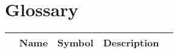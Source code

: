\section{Glossary}\label{sec:glossary}

\begin{table}[h] \label{t:glossary}
    \begin{tabular}{lllll}
        & \textbf{Name}  & \textbf{Symbol} & \textbf{Description} \\
        \hline
    \end{tabular}
\end{table}

